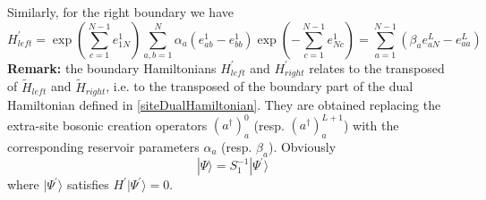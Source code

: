 \documentclass[10pt]{article}
\numberwithin{equation}{section}
\numberwithin{equation}{subsection}
\begin{document}
Similarly, for the right boundary we have 
\begin{equation}
H_{left}^{'}=\exp{\left(\sum_{c=1}^{N-1}e_{1N}^{1}\right)}\sum_{a,b=1}^{N}\alpha_{a}\left(e_{ab}^{1}-e_{bb}^{1}\right)\exp{\left(-\sum_{c=1}^{N-1}e_{Nc}^{1}\right)}=\sum_{a=1}^{N-1}\left(\beta_{a}e_{aN}^{L}-e_{aa}^{L}\right)
\end{equation}
\textbf{Remark:} the boundary Hamiltonians $H_{left}^{'}$ and $H_{right}^{'}$ relates to the transposed of  $\widetilde{H}_{left}$ and $\widetilde{H}_{right}$, i.e. to the transposed of the boundary part of the dual Hamiltonian  defined in \eqref{siteDualHamiltonian}. They are obtained replacing the  extra-site bosonic creation operators $(a^{\dagger})_{a}^{0}$  (resp. $(a^{\dagger})_{a}^{L+1}$) with the corresponding reservoir parameters $\alpha_a$ (resp. $\beta_a$).
\newline\newline
Obviously
\begin{equation}\label{S1-Inverse}
	|\Psi\rangle =S_{1}^{-1}|\Psi^{'}\rangle
\end{equation}
where $|\Psi^{'}\rangle$ satisfies $H^{'}|\Psi^{'}\rangle=0$.
\end{document}
